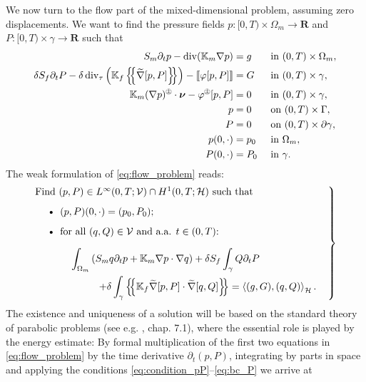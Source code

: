 \documentclass[a4paper]{article}
\def\agrad{\widetilde\nabla}
\def\avg#1{\left\{\mskip-5mu\left\{#1\right\}\mskip-5mu\right\}}
\def\div{\operatorname{div}}
\def\dt{\prtl_t}
\def\dual#1#2{\left\langle #1,#2\right\rangle}
\def\Hf{\mathcal H}
\def\jmp#1{\left\llbracket #1 \right\rrbracket}
\def\nnu{\vc\nu}
\def\pphi{{\varphi}}
\def\prtl{\partial}
\def\Real{{\mathbf R}}
\def\tn#1{{\mathbb{#1}}}    %
\def\Vf{{\mathcal V}} %
\def\vc#1{\mathbf{\boldsymbol{#1}}}     %
\newcommand{\eq}[1]{\begin{equation}#1\end{equation}}
\newcommand{\opm}{ %
  {\mathbin{
    \mathchoice
      {\buildcirclepm{\displaystyle     }{0.14ex}{0.95}{0.05ex}{.7}}
      {\buildcirclepm{\textstyle        }{0.14ex}{0.95}{0.05ex}{.7}}
      {\buildcirclepm{\scriptstyle      }{0.13ex}{0.955}{0.04ex}{.55}}
      {\buildcirclepm{\scriptscriptstyle}{0.08ex}{0.95}{0.03ex}{.45}}
  }} 
}
\newcommand\buildcirclepm[5]{%
  \begin{tikzpicture}[baseline=(X.base), inner sep=-#5, outer sep=-.65]
    \node[draw,circle,line width=#4] (X)  {\footnotesize\raisebox{#2}{\scalebox{#3}{$#1\pm$}}};
  \end{tikzpicture}%
}
\begin{document}
We now turn to the flow part of the mixed-dimensional problem, assuming zero displacements.
We want to find the pressure fields $p:[0,T)\times\Omega_m\to\Real$ and $P:[0,T)\times\gamma\to\Real$ such that
\begin{subequations}\label{eq:flow_problem}
\begin{align}
S_m\dt p - \div(\tn K_m\nabla p) &= g &&\mbox{ in }(0,T)\times\Omega_m,\\
\delta S_f\dt P - \delta\div_\tau\left(\tn K_f\avg{\agrad[p,P]}\right) - \jmp{\pphi[p,P]} &= G &&\mbox{ in }(0,T)\times\gamma,\\
\label{eq:condition_pP} \tn K_m(\nabla p)^\opm\cdot\nnu - \pphi^\opm[p,P] &= 0 &&\mbox{ in }(0,T)\times\gamma,\\
\label{eq:bc_p} p & = 0 &&\mbox{ on }(0,T)\times\Gamma,\\
\label{eq:bc_P} P & = 0 &&\mbox{ on }(0,T)\times\prtl\gamma,\\
\label{eq:init_p} p(0,\cdot) & = p_0 &&\mbox{ in }\Omega_m,\\
\label{eq:init_P} P(0,\cdot) & = P_0 &&\mbox{ in }\gamma.
\end{align}
\end{subequations}
The weak formulation of \eqref{eq:flow_problem} reads:
\eq{ \label{eq:flow_weak} \left.\begin{minipage}{0.85\textwidth}
Find $(p,P)\in L^\infty(0,T;\Vf)\cap H^1(0,T;\Hf)$ such that
\begin{itemize}
\item $(p,P)(0,\cdot)=(p_0,P_0)$;
\item for all $(q,Q)\in\Vf$ and a.a. $t\in(0,T)$:
\[ \begin{aligned}\int_{\Omega_m}\left(S_m q\dt p + \tn K_m\nabla p\cdot\nabla q\right) + \delta S_f\int_\gamma Q\dt P \hspace{2cm}\\
+ \delta\int_\gamma\avg{\tn K_f\agrad[p,P]\cdot\agrad[q,Q]}
= \dual{(g,G)}{(q,Q)}_\Hf.\end{aligned} \]
\end{itemize}
\end{minipage}\right\} }
The existence and uniqueness of a solution will be based on the standard theory of parabolic problems (see e.g. \cite{evans_pde}, chap. 7.1), where the essential role is played by the energy estimate:
By formal multiplication of the first two equations in \eqref{eq:flow_problem} by the time derivative $\dt(p,P)$, integrating by parts in space and applying the conditions \eqref{eq:condition_pP}--\eqref{eq:bc_P} we arrive at
\end{document}
